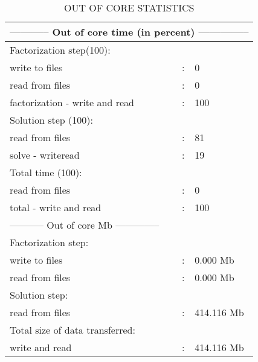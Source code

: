 \documentclass[forprint]{WHUBachelor}
\begin{document}
\begin{table}[H]
  \centering
  \caption{OUT OF CORE STATISTICS}

    \begin{tabular}{lcl}
\multicolumn{3}{c}{ ----------- Out of core time (in percent) --------------} \\
\hline
\multicolumn{3}{l}{Factorization step(100):} \\
      write to files & : & 0 \\
      read from files&:& 0 \\ 
      factorization - write and read&:& 100 \\
\hline 
\multicolumn{3}{l}{Solution step (100):} \\
      read from files&:& 81 \\
      solve - writeread&:& 19 \\
Total time (100):& & \\
      read from files&:& 0 \\
      total - write and read&: &100 \\
----------- Out of core Mb -------------- \\
Factorization step:& &\\
      write to files &:&      0.000 Mb\\
      read from files&: &     0.000 Mb\\
Solution step: & & \\
      read from files&:&    414.116 Mb \\
Total size of data transferred:&  & \\
      write and read    & :  &  414.116 Mb\\
\hline
    \end{tabular}%

  \label{tab:addlabel}%

\end{table}%
\end{document}
